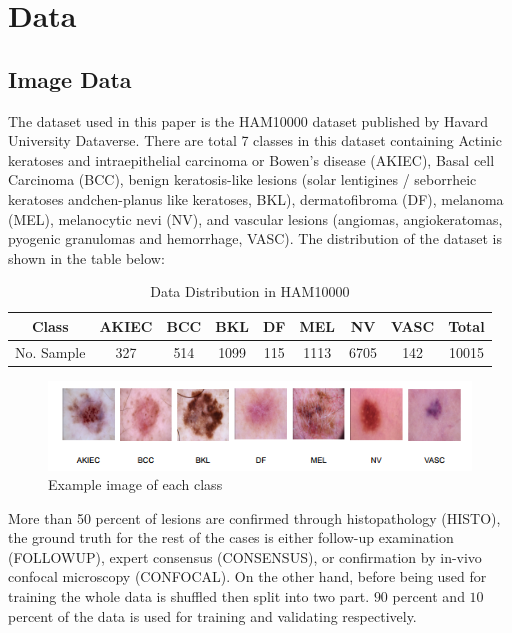 \section{Data}
\subsection{Image Data}
The dataset used in this paper is the HAM10000 dataset published by Havard University Dataverse\cite{10417}. There are total 7 classes in this dataset containing Actinic keratoses and intraepithelial carcinoma or Bowen's disease (AKIEC), Basal cell Carcinoma (BCC),  benign keratosis-like lesions (solar lentigines / seborrheic keratoses andchen-planus like keratoses, BKL), dermatofibroma (DF), melanoma (MEL), melanocytic nevi (NV), and vascular lesions (angiomas, angiokeratomas, pyogenic granulomas and hemorrhage, VASC). The distribution of the dataset is shown in the table below:
\FloatBarrier
\begin{table}[ht]
	\centering
	\begin{tabular}{|c c c c c c c c c|} 
		\hline
		Class & AKIEC & BCC & BKL & DF & MEL & NV & VASC & Total \\ 
		\hline
		No. Sample & 327 & 514 & 1099 & 115 & 1113 & 6705 & 142 & 10015 \\
		\hline
	\end{tabular}
	\caption{Data Distribution in HAM10000}
	\label{table:1}
\end{table}
\FloatBarrier
\begin{figure}[h]
	\centering
	\includegraphics[width=1\linewidth]{img/DataDistribution}
	\caption{Example image of each class}
	\label{fig:datadistribution}
\end{figure}
More than 50 percent of lesions are confirmed through histopathology (HISTO), the ground truth for the rest of the cases is either follow-up examination (FOLLOWUP), expert consensus (CONSENSUS), or confirmation by in-vivo confocal microscopy (CONFOCAL). On the other hand, before being used for training the whole data is shuffled then split into two part. $90$ percent and $10$ percent of the data is used for training and validating respectively.\\
